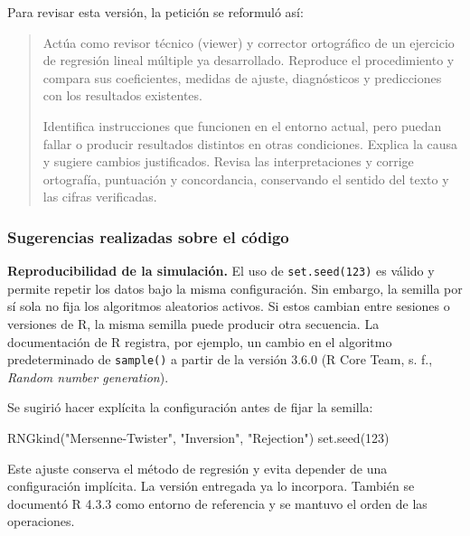 \documentclass[
  11pt,
  letterpaper,
]{article}
\newenvironment{Shaded}{}{}
\newcommand{\DecValTok}[1]{\textcolor[rgb]{0.25,0.63,0.44}{#1}}
\newcommand{\FunctionTok}[1]{\textcolor[rgb]{0.02,0.16,0.49}{#1}}
\newcommand{\NormalTok}[1]{#1}
\newcommand{\StringTok}[1]{\textcolor[rgb]{0.25,0.44,0.63}{#1}}
\begin{document}
Para revisar esta versión, la petición se reformuló así:

\begin{quote}
Actúa como revisor técnico (viewer) y corrector ortográfico de un
ejercicio de regresión lineal múltiple ya desarrollado. Reproduce el
procedimiento y compara sus coeficientes, medidas de ajuste,
diagnósticos y predicciones con los resultados existentes.

Identifica instrucciones que funcionen en el entorno actual, pero puedan
fallar o producir resultados distintos en otras condiciones. Explica la
causa y sugiere cambios justificados. Revisa las interpretaciones y
corrige ortografía, puntuación y concordancia, conservando el sentido
del texto y las cifras verificadas.
\end{quote}

\hypertarget{sugerencias-realizadas-sobre-el-cuxf3digo}{%
\subsubsection{Sugerencias realizadas sobre el
código}\label{sugerencias-realizadas-sobre-el-cuxf3digo}}

\textbf{Reproducibilidad de la simulación.} El uso de
\texttt{set.seed(123)} es válido y permite repetir los datos bajo la
misma configuración. Sin embargo, la semilla por sí sola no fija los
algoritmos aleatorios activos. Si estos cambian entre sesiones o
versiones de R, la misma semilla puede producir otra secuencia. La
documentación de R registra, por ejemplo, un cambio en el algoritmo
predeterminado de \texttt{sample()} a partir de la versión 3.6.0 (R Core
Team, s. f., \emph{Random number generation}).

Se sugirió hacer explícita la configuración antes de fijar la semilla:

\begin{Shaded}
\begin{Highlighting}[]
\FunctionTok{RNGkind}\NormalTok{(}\StringTok{"Mersenne{-}Twister"}\NormalTok{, }\StringTok{"Inversion"}\NormalTok{, }\StringTok{"Rejection"}\NormalTok{)}
\FunctionTok{set.seed}\NormalTok{(}\DecValTok{123}\NormalTok{)}
\end{Highlighting}
\end{Shaded}

Este ajuste conserva el método de regresión y evita depender de una
configuración implícita. La versión entregada ya lo incorpora. También
se documentó R 4.3.3 como entorno de referencia y se mantuvo el orden de
las operaciones.
\end{document}
